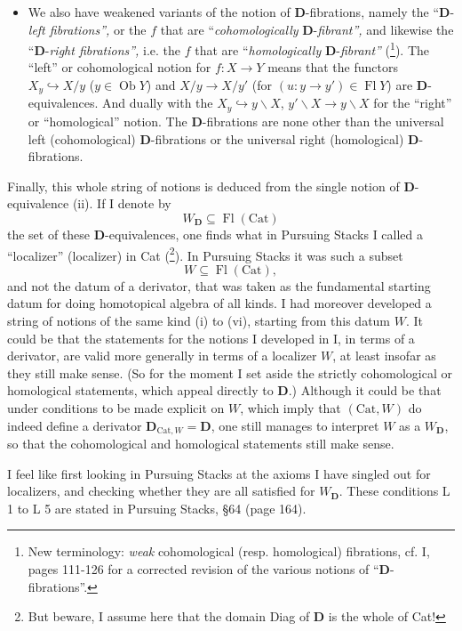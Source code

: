 \documentclass[11pt]{article}
\newcommand{\printedpage}[1]{\marginpar{\footnotesize p.~#1}}
\newcommand{\msp}[1]{\marginpar{\footnotesize [#1]}}
\newcommand{\D}{\mathbf{D}}
\newcommand{\Cat}{\mathrm{Cat}}
\newcommand{\Fl}{\operatorname{Fl}}
\newcommand{\Ob}{\operatorname{Ob}}
\begin{document}
\begin{itemize}
\item[(vi)] We also have weakened variants of the notion of $\D$-fibrations, namely the ``$\D$-\textit{left fibrations'',} or the $f$ that are ``\textit{cohomologically} $\D$-\textit{fibrant'',} and likewise the ``$\D$-\textit{right fibrations'',} i.e. the $f$ that are ``\textit{homologically} $\D$-\textit{fibrant''} (\footnote{New terminology: \textit{weak} cohomological (resp. homological) fibrations, cf. I, pages 111-126 for a corrected revision of the various notions of ``$\D$-fibrations''.}). The ``left''
\printedpage{2}
or cohomological notion for $f : X \longrightarrow Y$ means that the functors $X_y \hookrightarrow X/y$ ($y \in \Ob Y$) and $X/y \longrightarrow X/y'$ (for $(u : y \longrightarrow y') \in \Fl Y$) are $\D$-equivalences. And dually with the $X_y \hookrightarrow y\backslash X$, $y'\backslash X \longrightarrow y\backslash X$ for the ``right'' or ``homological'' notion. The $\D$-fibrations are none other than the universal left (cohomological) $\D$-fibrations or the universal right (homological) $\D$-fibrations.
\end{itemize}

Finally, this whole string of notions is deduced from the single notion of $\D$-equivalence (ii). If I denote by
\[
W_{\D} \subseteq \Fl(\Cat)
\]
the set of these $\D$-equivalences, one finds what in Pursuing Stacks I called a ``localizer'' (localizer) in Cat (\footnote{But beware, I assume here that the domain Diag of $\D$ is the whole of Cat!}). In Pursuing Stacks it was such a subset
\[
W \subseteq \Fl(\Cat),
\]
and not the datum of a derivator, that
\msp{page 3}
was taken as the fundamental starting datum for doing homotopical algebra of all kinds. I had moreover developed a string of notions of the same kind (i) to (vi), starting from this datum $W$. It could be that the statements for the notions I developed in I, in terms of a derivator, are valid more generally in terms of a localizer $W$, at least insofar as they still make sense. (So for the moment I set aside the strictly cohomological or homological statements, which appeal directly to $\D$.) Although it could be that under conditions to be made explicit on $W$, which imply that $(\Cat, W)$ do indeed define a derivator $\D_{\Cat,W} = \D$, one still manages to interpret $W$ as a $W_{\D}$, so that the cohomological and homological statements still make sense.

I feel like first looking in Pursuing Stacks at the axioms I have singled out for localizers, and checking whether they are all satisfied for
\msp{page 4}
$W_{\D}$. These conditions L 1 to L 5 are stated in Pursuing Stacks, §64 (page 164).
\end{document}

